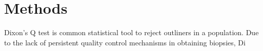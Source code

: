\chapter{Methods}

Dixon's Q test is common statistical tool to reject outliners in a population. Due to the lack of persistent quality control mechanisms in obtaining biopsies, Di